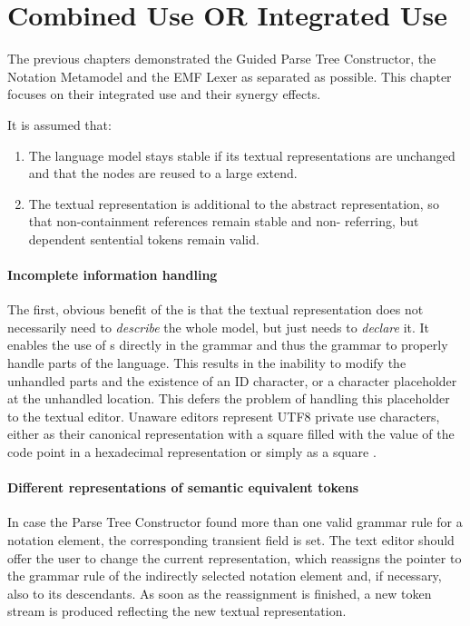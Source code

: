 \section{Combined Use OR Integrated Use}

The previous chapters  demonstrated the Guided Parse Tree Constructor, the Notation Metamodel and the EMF Lexer as separated as possible. This chapter focuses on their integrated use and their synergy effects. 

It is assumed that:
\begin{enumerate}
	\item The language model stays stable if its textual representations are unchanged and that the nodes are reused to a large extend.
	\item The textual representation is additional to the abstract representation, so that non-containment references remain stable and non- referring, but  dependent sentential tokens remain valid.
\end{enumerate}


\paragraph{Incomplete information handling}
The first, obvious benefit of the  is that the textual representation does not necessarily need to \emph{describe} the whole model, but just needs to \emph{declare} it. It enables the use of s directly in the grammar and thus the grammar to properly handle parts of the language. This results in the inability to modify the unhandled parts and the existence of an ID character, or a character placeholder at the unhandled location. This defers the problem of handling this placeholder to the textual editor. Unaware editors represent UTF8 private use characters, either as their canonical representation with a square filled with the value of the code point in a hexadecimal representation or simply as a square \code{$\square$}.

\paragraph{Different representations of semantic equivalent tokens}
In case the Parse Tree Constructor found more than one valid grammar rule for a notation element, the corresponding transient field is set. The text editor should offer the user to change the current representation, which reassigns the pointer to the grammar rule of the indirectly selected notation element and, if necessary, also to its descendants. As soon as the reassignment is finished, a new token stream is produced reflecting the new textual representation.


